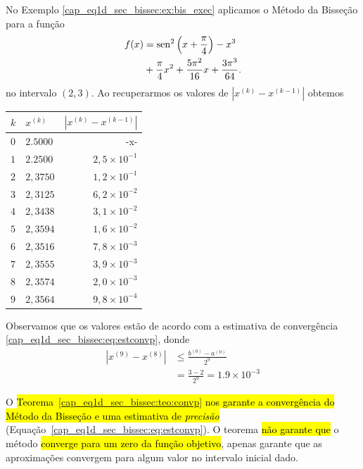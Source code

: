\begin{ex}\label{cap_eq1d_sec_bissec:ex:bis_convp}
  No Exemplo \ref{cap_eq1d_sec_bissec:ex:bis_exec} aplicamos o Método da Bisseção para a função
  \begin{equation}
    \begin{aligned}
      f(x) &= \operatorname{sen}^2\left(x+\frac{\pi}{4}\right) - x^3 \\
           &+ \frac{\pi}{4}x^2 + \frac{5\pi^2}{16}x + \frac{3\pi^3}{64}.
    \end{aligned}
\end{equation}
no intervalo $(2, 3)$. Ao recuperarmos os valores de $\left|x^{(k)}-x^{(k-1)}\right|$ obtemos
\begin{center}
  \begin{tabular}[H]{l|l|r}
    $k$ & $x^{(k)}$ & $\left|x^{(k)}-x^{(k-1)}\right|$\\\hline
    $0$ & $2.5000$ & -x-\\
    $1$ & $2.2500$ & $2,5\times 10^{-1}$\\
    $2$ & $2,3750$ & $1,2\times 10^{-1}$\\
    $3$ & $2,3125$ & $6,2\times 10^{-2}$\\
    $4$ & $2,3438$ & $3,1\times 10^{-2}$\\
    $5$ & $2,3594$ & $1,6\times 10^{-2}$\\
    $6$ & $2,3516$ & $7,8\times 10^{-3}$\\
    $7$ & $2,3555$ & $3,9\times 10^{-3}$\\
    $8$ & $2,3574$ & $2,0\times 10^{-3}$\\
    $9$ & $2,3564$ & $9,8\times 10^{-4}$\\\hline
  \end{tabular}
\end{center}

Observamos que os valores estão de acordo com a estimativa de convergência \ref{cap_eq1d_sec_bissec:eq:estconvp}, donde
\begin{align}
  |x^{(9)}-x^{(8)}| &\leq \frac{b^{(0)}-a^{(0)}}{2^{9}}\\
                     &= \frac{3 - 2}{2^{9}} = 1.9\times 10^{-3}
\end{align}
\end{ex}

O \hl{Teorema~{\ref{cap_eq1d_sec_bissec:teo:convp}} nos garante a convergência do Método da Bisseção e uma estimativa de \emph{precisão}} (Equação~\ref{cap_eq1d_sec_bissec:eq:estconvp}). O teorema \hl{não garante que} o método \hl{converge para um zero da função objetivo}, apenas garante que as aproximações convergem para algum valor no intervalo inicial dado.

